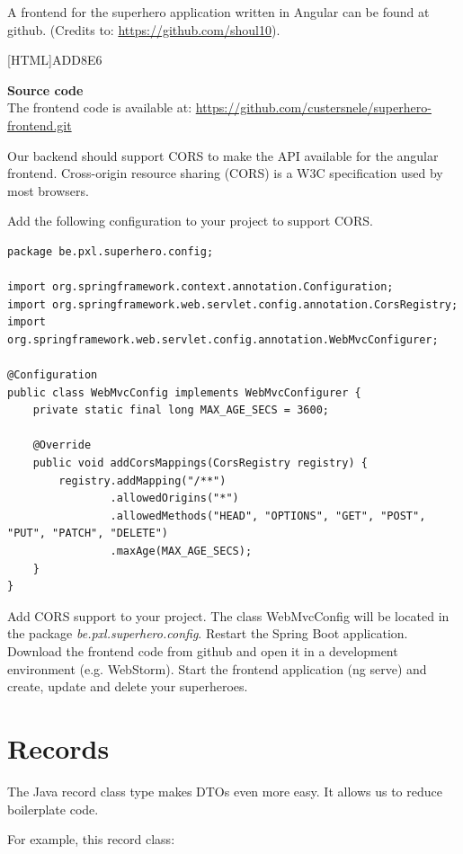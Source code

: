 A frontend for the superhero application written in Angular can be found at github.  (Credits to: \url{https://github.com/shoul10}).


 [HTML]{ADD8E6}{\parbox{\textwidth}{%
\noindent \textbf{Source code}\\
The frontend code is available at: \url{https://github.com/custersnele/superhero-frontend.git}
}}

Our backend should support CORS to make the API available for the angular frontend.  Cross-origin resource sharing (CORS) is a W3C specification used by most browsers.  

Add the following configuration to your project to support CORS.

\begin{lstlisting}[frame=single]
package be.pxl.superhero.config;

import org.springframework.context.annotation.Configuration;
import org.springframework.web.servlet.config.annotation.CorsRegistry;
import org.springframework.web.servlet.config.annotation.WebMvcConfigurer;

@Configuration
public class WebMvcConfig implements WebMvcConfigurer {
    private static final long MAX_AGE_SECS = 3600;

    @Override
    public void addCorsMappings(CorsRegistry registry) {
        registry.addMapping("/**")
                .allowedOrigins("*")
                .allowedMethods("HEAD", "OPTIONS", "GET", "POST", "PUT", "PATCH", "DELETE")
                .maxAge(MAX_AGE_SECS);        
    }
}
\end{lstlisting}

\begin{oefening}
Add CORS support to your project. The class WebMvcConfig will be located in the package  \textit{be.pxl.superhero.config}.  Restart the Spring Boot application.
Download the frontend code from github and open it in a  development environment (e.g.  WebStorm).  Start the frontend application (ng serve) and create, update and delete your superheroes.
\end{oefening}

\section{Records}

The Java record class type makes DTOs even more easy. It allows us to reduce boilerplate code. 

For example, this record class:

